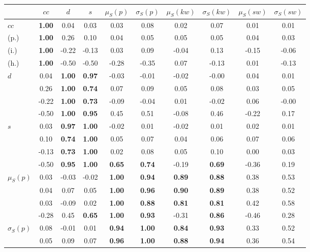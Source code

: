 \begin{table*}[h!]
\begin{center}
\begin{tabular}{| l || c | c | c | c | c | c | c | c | c |}\hline
 & $cc$ & $d$ & $s$ & $\mu_S(p)$ & $\sigma_S(p)$ & $\mu_S(kw)$ & $\sigma_S(kw)$ & $\mu_S(sw)$ & $\sigma_S(sw)$ \\\hline\hline
$cc$ & {\bf 1.00} & 0.04 & 0.03 & 0.03 & 0.08 & 0.02 & 0.07 & 0.01 & 0.01 \\
(p.) & {\bf 1.00} & 0.26 & 0.10 & 0.04 & 0.05 & 0.05 & 0.05 & 0.04 & 0.03 \\
(i.) & {\bf 1.00} & -0.22 & -0.13 & 0.03 & 0.09 & -0.04 & 0.13 & -0.15 & -0.06 \\
(h.) & {\bf 1.00} & -0.50 & -0.50 & -0.28 & -0.35 & 0.07 & -0.13 & 0.01 & -0.13 \\\hline
$d$ & 0.04 & {\bf 1.00} & {\bf 0.97} & -0.03 & -0.01 & -0.02 & -0.00 & 0.04 & 0.01 \\
 & 0.26 & {\bf 1.00} & {\bf 0.74} & 0.07 & 0.09 & 0.05 & 0.08 & 0.03 & 0.05 \\
 & -0.22 & {\bf 1.00} & {\bf 0.73} & -0.09 & -0.04 & 0.01 & -0.02 & 0.06 & -0.00 \\
 & -0.50 & {\bf 1.00} & {\bf 0.95} & 0.45 & 0.51 & -0.08 & 0.46 & -0.22 & 0.17 \\\hline
$s$ & 0.03 & {\bf 0.97} & {\bf 1.00} & -0.02 & 0.01 & -0.02 & 0.01 & 0.02 & 0.01 \\
 & 0.10 & {\bf 0.74} & {\bf 1.00} & 0.05 & 0.07 & 0.04 & 0.06 & 0.07 & 0.06 \\
 & -0.13 & {\bf 0.73} & {\bf 1.00} & 0.02 & 0.08 & 0.05 & 0.10 & 0.00 & 0.03 \\
 & -0.50 & {\bf 0.95} & {\bf 1.00} & {\bf 0.65} & {\bf 0.74} & -0.19 & {\bf 0.69} & -0.36 & 0.19 \\\hline
$\mu_S(p)$ & 0.03 & -0.03 & -0.02 & {\bf 1.00} & {\bf 0.94} & {\bf 0.89} & {\bf 0.88} & 0.38 & 0.53 \\
 & 0.04 & 0.07 & 0.05 & {\bf 1.00} & {\bf 0.96} & {\bf 0.90} & {\bf 0.89} & 0.38 & 0.52 \\
 & 0.03 & -0.09 & 0.02 & {\bf 1.00} & {\bf 0.88} & {\bf 0.81} & {\bf 0.81} & 0.42 & 0.58 \\
 & -0.28 & 0.45 & {\bf 0.65} & {\bf 1.00} & {\bf 0.93} & -0.31 & {\bf 0.86} & -0.46 & 0.28 \\\hline
$\sigma_S(p)$ & 0.08 & -0.01 & 0.01 & {\bf 0.94} & {\bf 1.00} & {\bf 0.84} & {\bf 0.93} & 0.33 & 0.52 \\
 & 0.05 & 0.09 & 0.07 & {\bf 0.96} & {\bf 1.00} & {\bf 0.88} & {\bf 0.94} & 0.36 & 0.54 \\

\end{tabular}
\end{center}
\end{table*}
